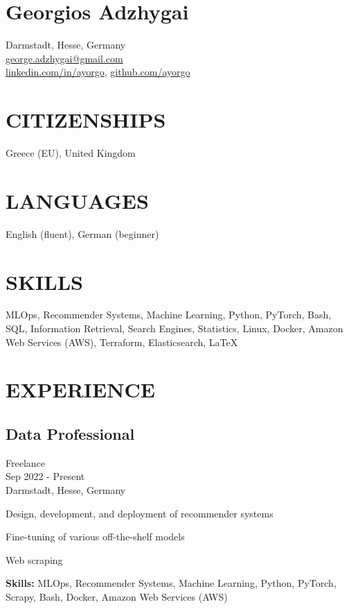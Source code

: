\documentclass[a4paper,10pt]{article}
\begin{document}
\section*{\Large Georgios Adzhygai}
Darmstadt, Hesse, Germany \\
\href{mailto:george.adzhygai@gmail.com}{george.adzhygai@gmail.com} \\
\href{https://www.linkedin.com/in/ayorgo}{linkedin.com/in/ayorgo},
\href{https://github.com/ayorgo}{github.com/ayorgo}

\section*{CITIZENSHIPS}
Greece (EU), United Kingdom

\section*{LANGUAGES}
English (fluent), German (beginner)

\section*{SKILLS}
MLOps, Recommender Systems, Machine Learning, Python, PyTorch, Bash, SQL, Information Retrieval, Search Engines, Statistics, Linux, Docker, Amazon Web Services (AWS), Terraform, Elasticsearch, {\selectfont\LaTeX}

\section*{EXPERIENCE}

\subsection*{Data Professional}
Freelance \\
Sep 2022 - Present \\
Darmstadt, Hesse, Germany
\begin{bulletlist}
    \item Design, development, and deployment of recommender systems
    \item Fine-tuning of various off-the-shelf models
    \item Web scraping
\end{bulletlist}
\textbf{Skills:} MLOps, Recommender Systems, Machine Learning, Python, PyTorch, Scrapy, Bash, Docker, Amazon
Web Services (AWS)
\end{document}
